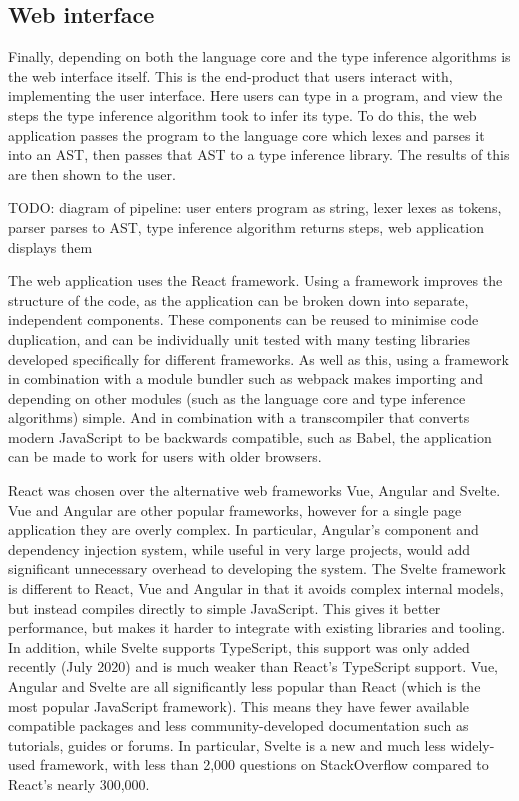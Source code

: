 \documentclass[a4paper,fleqn,oneside,12pt]{report}
\begin{document}
\subsection{Web interface}\label{id:h.q67ivlz7h61r}

Finally, depending on both the language core and the type inference algorithms is the web interface itself. This is the end-product that users interact with, implementing the user interface. Here users can type in a program, and view the steps the type inference algorithm took to infer its type. To do this, the web application passes the program to the language core which lexes and parses it into an AST, then passes that AST to a type inference library. The results of this are then shown to the user.

TODO: diagram of pipeline: user enters program as string, lexer lexes as tokens, parser parses to AST, type inference algorithm returns steps, web application displays them

The web application uses the React framework. Using a framework improves the structure of the code, as the application can be broken down into separate, independent components. These components can be reused to minimise code duplication, and can be individually unit tested with many testing libraries developed specifically for different frameworks. As well as this, using a framework in combination with a module bundler such as webpack makes importing and depending on other modules (such as the language core and type inference algorithms) simple. And in combination with a transcompiler that converts modern JavaScript to be backwards compatible, such as Babel, the application can be made to work for users with older browsers.

React was chosen over the alternative web frameworks Vue, Angular and Svelte. Vue and Angular are other popular frameworks, however for a single page application they are overly complex. In particular, Angular's component and dependency injection system, while useful in very large projects, would add significant unnecessary overhead to developing the system. The Svelte framework is different to React, Vue and Angular in that it avoids complex internal models, but instead compiles directly to simple JavaScript. This gives it better performance, but makes it harder to integrate with existing libraries and tooling. In addition, while Svelte supports TypeScript, this support was only added recently (July 2020) and is much weaker than React’s TypeScript support. Vue, Angular and Svelte are all significantly less popular than React (which is the most popular JavaScript framework). This means they have fewer available compatible packages and less community-developed documentation such as tutorials, guides or forums. In particular, Svelte is a new and much less widely-used framework, with less than 2,000 questions on StackOverflow compared to React’s nearly 300,000.
\end{document}
